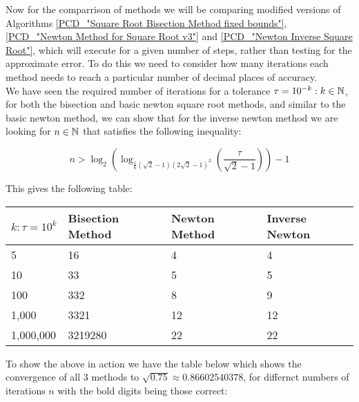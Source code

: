 Now for the comparrison of methods we will be comparing modified versions of Algorithms \ref{PCD_"Square Root Bisection Method fixed bounds"}, \ref{PCD_"Newton Method for Square Root v3"} and \ref{PCD_"Newton Inverse Square Root"}, which will execute for a given number of steps, rather than testing for the approximate error. To do this we need to consider how many iterations each method needs  to reach a particular number of decimal places of accuracy.\\

We have seen the required number of iterations for a tolerance \(\tau = 10^{-k} : k \in \mathbb{N}\), for both the bisection and basic newton square root methods, and similar to the basic newton method, we can show that for the inverse newton method we are looking for \(n \in \mathbb{N}\) that satisfies the following inequality:

\[n > \log_2\left(\log_{\tfrac{1}{6}(\sqrt{2} - 1)(2\sqrt{2} - 1)^3}\left(\frac{\tau}{\sqrt{2} - 1}\right)\right) - 1\]

This gives the following table:

\begin{center}
\begin{tabular}{|p{3cm}|p{3cm}|p{3cm}|p{3cm}|}
\hline
\(k : \tau = 10^k\) & Bisection Method & Newton Method & Inverse Newton\\\hline
5 & 		16 &		4 &		4\\\hline
10 & 		33 &		5 &		5\\\hline
100 & 		332 &		8 &		9\\\hline
1,000 & 	3321 &		12 &	12\\\hline
1,000,000 & 3219280 &	22 &	22\\\hline
\end{tabular}
\end{center}

To show the above in action we have the table below which shows the convergence of all 3 methods to \(\sqrt{0.75} \approx 0.86602540378\), for differnct numbers of iterations \(n\) with the bold digits being those correct:


